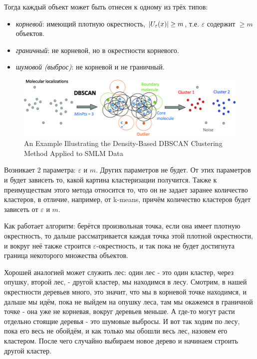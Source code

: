 Тогда каждый объект может быть отнесен к одному из трёх типов:
\begin{itemize}
    \item \textit{корневой}: имеющий плотную окрестность,  {$\left|U_\varepsilon (x)\right| \geq m$}, т.е. $\varepsilon$ содержит $\geq m$ объектов.
    \item \textit{граничный}: не корневой, но в окрестности корневого.
    \item \textit{шумовой (выброс)}: не корневой и не граничный.
\end{itemize}
\begin{figure}[h!]
    \centering
    \includegraphics[width=0.9\linewidth]{png/An-Example-Illustrating-the-Density-Based-DBSCAN-Clustering-Method-Applied-to-SMLM-Data.png}
    \caption{An Example Illustrating the Density-Based DBSCAN Clustering Method Applied to SMLM Data}
    \label{fig:enter-label}
\end{figure}
Возникает 2 параметра: $\varepsilon$ и $m$. Других параметров не будет. От этих параметров и будет зависеть то, какой картина кластеризации получится. Также к преимуществам этого метода относится то, что он не задает заранее количество кластеров, в отличие, например, от k-means, причём количество кластеров будет зависеть от $\varepsilon$ и $m$. 

Как работает алгоритм: берётся произвольная точка, если она имеет плотную окрестность, то дальше рассматривается каждая точка этой плотной окрестности, и вокруг неё также строится $\varepsilon$-окрестность, и так пока не будет достигнута граница некоторого множества объектов. 

Хорошей аналогией может служить лес: один лес - это один кластер, через опушку, второй лес, - другой кластер, мы находимся в лесу. Смотрим, в нашей окрестности деревьев много, это значит, что мы в корневой точке находимся, и дальше мы идём, пока не выйдем на опушку леса, там мы окажемся в граничной точке - она уже не корневая, вокруг деревьев меньше. А где-то могут расти отдельно стоящие деревья - это шумовые выбросы. И вот так ходим по лесу, пока его весь не обойдём, и как только мы обошли весь лес, назовем его кластером. После чего случайно выбираем новое дерево и начинаем строить другой кластер.

